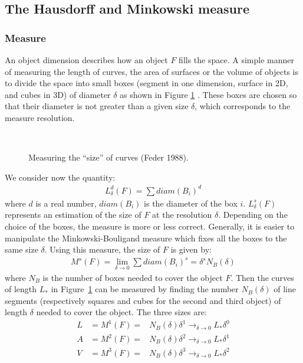 \subsection{The Hausdorff and Minkowski measure} 
\label{Hausdorff}
\subsubsection*{Measure}
An object dimension describes how an object $F$ fills the space.
A simple manner of measuring the length of
curves, the area of surfaces or the volume of objects is to divide the 
space into small boxes (segment in one dimension, surface in 2D, and cubes
in 3D)  of diameter $\delta$ as shown in Figure \ref{fig_mes} 
\cite{frac:falconer90}. These boxes
are chosen so that their diameter is not greater than a given size $\delta$,
which corresponds to the measure resolution.
\begin{figure}[htb]
\centerline{
\hbox{
}}
\caption{Measuring the ``size'' of curves (Feder 1988).}
\label{fig_mes}
\end{figure}

We consider now the quantity:
\begin{eqnarray}
L_{\delta}^d(F) = \sum diam(B_i)^d
\end{eqnarray}
where $d$ is a real number, $diam(B_i)$ is the diameter of the  box  $i$.
$L_{\delta}^s(F)$ represents an estimation of the size of $F$ at the resolution
$\delta$. Depending on the choice of the boxes, the measure is more or less 
correct. Generally, it is easier to manipulate the Minkowski-Bouligand 
measure which fixes all the boxes to the same size $\delta$. Using this
measure, the size of $F$ is given by:
\begin{eqnarray}
M^s(F) = \lim_{\delta \rightarrow 0} \sum diam(B_i)^s = \delta^s N_B(\delta)
\end{eqnarray}
where $N_B$ is the number of boxes needed to cover the object $F$.
Then the curves of length $L_\ast$ in Figure~\ref{fig_mes}   
can be measured by finding the number $N_B(\delta)$ of line segments
 (respectively squares and cubes for the second and third object)
of length $\delta$ needed to cover the object. The three sizes are:
\begin{eqnarray}
L  &  = M^1(F) = & N_B(\delta) \delta^1 \mathop\rightarrow_{\delta \to 0} 
      L_\ast \delta^0  \nonumber  \\
A  & = M^2(F) = & N_B(\delta) \delta^2 \mathop\rightarrow_{\delta \to 0}
      L_\ast \delta^1 \nonumber \\
V  & = M^3(F) = & N_B(\delta) \delta^3  \mathop\rightarrow_{\delta \to 0}
      L_\ast \delta^2         
\end{eqnarray}

